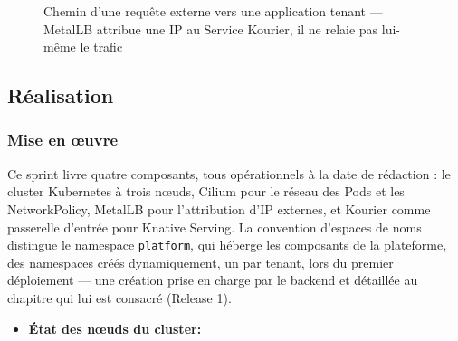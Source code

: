 \begin{figure}[H]
\centering
{}
\caption{Chemin d'une requête externe vers une application tenant — MetalLB attribue une IP au Service Kourier, il ne relaie pas lui-même le trafic}
\label{fig:architecture-reseau}
\end{figure}

\subsection{Réalisation}

\subsubsection{Mise en œuvre}

Ce sprint livre quatre composants, tous opérationnels à la date de rédaction : le cluster Kubernetes à trois nœuds, Cilium pour le réseau des Pods et les NetworkPolicy, MetalLB pour l'attribution d'IP externes, et Kourier comme passerelle d'entrée pour Knative Serving. La convention d'espaces de noms distingue le namespace \texttt{platform}, qui héberge les composants de la plateforme, des namespaces créés dynamiquement, un par tenant, lors du premier déploiement — une création prise en charge par le backend et détaillée au chapitre qui lui est consacré (Release 1).

\begin{itemize}
    \item \textbf{État des nœuds du cluster:}
\end{itemize}


